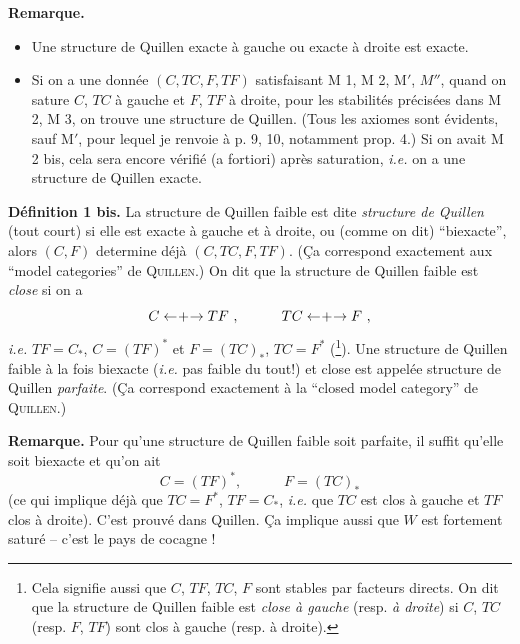 \documentclass[11pt]{article}
\newcommand{\printedpage}[1]{\marginpar{\footnotesize p.~#1}}
\newcommand{\msp}[1]{\marginpar{\footnotesize [#1]}}
\newcommand{\clarrow}{\mathrel{\leftarrow\mkern-4mu{+}\mkern-4mu\rightarrow}}
\begin{document}
\msp{page 28}
\noindent\textbf{Remarque.}
\begin{itemize}[leftmargin=3em]
\item[a)] Une structure de Quillen exacte à gauche ou exacte à droite est exacte.
\item[b)] Si on a une donnée $(C, TC, F, TF)$ satisfaisant M 1, M 2, M$'$, $M''$, quand on sature $C$, $TC$ à gauche et $F$, $TF$ à droite, pour les stabilités précisées dans M 2, M 3, on trouve une structure de Quillen. (Tous les axiomes sont évidents, sauf M$'$, pour lequel je renvoie à p. 9, 10, notamment prop. 4.) Si on avait M 2 bis, cela sera encore vérifié (a fortiori) après saturation, \textit{i.e.} on a une structure de Quillen exacte.
\end{itemize}

\noindent\textbf{Définition 1 bis.} La structure de Quillen faible est dite \textit{structure de Quillen} (tout court) si elle est exacte à gauche et à droite, ou (comme on dit) “biexacte”, alors $(C, F)$ determine déjà $(C, TC, F, TF)$. (Ça correspond exactement aux “model categories” de \textsc{Quillen}.) On dit que la structure de Quillen faible est \textit{close} si on a %
\[
C \clarrow TF\ , \qquad\quad TC \clarrow F\ ,
\]
\textit{i.e.} $TF = C_*$, $C = (TF)^*$ et $F = (TC)_*$, $TC = F^*$ (\footnote[21]{Cela signifie aussi que $C$, $TF$, $TC$, $F$ sont stables par facteurs directs. On dit que la structure de Quillen faible est \textit{close à gauche} (resp. \textit{à droite}) si $C$, $TC$ (resp. $F$, $TF$) sont clos à gauche (resp. à droite).}). Une structure de Quillen faible à la fois biexacte (\textit{i.e.} pas faible du tout!) et close est appelée structure de Quillen \textit{parfaite}. (Ça correspond exactement à la “closed model category” de \textsc{Quillen}.)

\msp{page 29}
\noindent\textbf{Remarque.} Pour qu'une structure de Quillen faible soit parfaite, il suffit qu'elle soit biexacte et qu'on ait
\[
C = (TF)^*, \qquad\quad F = (TC)_*
\]
(ce qui implique déjà que $TC = F^*$, $TF = C_*$, \textit{i.e.} que $TC$ est clos à gauche et $TF$ clos à droite). C'est prouvé dans Quillen. Ça implique aussi que $W$ est fortement saturé -- c'est le pays de cocagne !

\clearpage
\printedpage{18}
\end{document}
